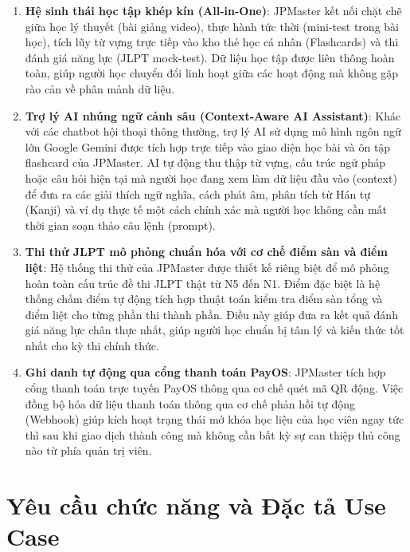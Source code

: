 \documentclass[../DoAn.tex]{subfiles}
\begin{document}
\begin{enumerate}
    \item \textbf{Hệ sinh thái học tập khép kín (All-in-One)}: JPMaster kết nối chặt chẽ giữa học lý thuyết (bài giảng video), thực hành tức thời (mini-test trong bài học), tích lũy từ vựng trực tiếp vào kho thẻ học cá nhân (Flashcards) và thi đánh giá năng lực (JLPT mock-test). Dữ liệu học tập được liên thông hoàn toàn, giúp người học chuyển đổi linh hoạt giữa các hoạt động mà không gặp rào cản về phân mảnh dữ liệu.
    
    \item \textbf{Trợ lý AI nhúng ngữ cảnh sâu (Context-Aware AI Assistant)}: Khác với các chatbot hội thoại thông thường, trợ lý AI sử dụng mô hình ngôn ngữ lớn Google Gemini được tích hợp trực tiếp vào giao diện học bài và ôn tập flashcard của JPMaster. AI tự động thu thập từ vựng, cấu trúc ngữ pháp hoặc câu hỏi hiện tại mà người học đang xem làm dữ liệu đầu vào (context) để đưa ra các giải thích ngữ nghĩa, cách phát âm, phân tích từ Hán tự (Kanji) và ví dụ thực tế một cách chính xác mà người học không cần mất thời gian soạn thảo câu lệnh (prompt).
    
    \item \textbf{Thi thử JLPT mô phỏng chuẩn hóa với cơ chế điểm sàn và điểm liệt}: Hệ thống thi thử của JPMaster được thiết kế riêng biệt để mô phỏng hoàn toàn cấu trúc đề thi JLPT thật từ N5 đến N1. Điểm đặc biệt là hệ thống chấm điểm tự động tích hợp thuật toán kiểm tra điểm sàn tổng và điểm liệt cho từng phần thi thành phần. Điều này giúp đưa ra kết quả đánh giá năng lực chân thực nhất, giúp người học chuẩn bị tâm lý và kiến thức tốt nhất cho kỳ thi chính thức.
    
    \item \textbf{Ghi danh tự động qua cổng thanh toán PayOS}: JPMaster tích hợp cổng thanh toán trực tuyến PayOS thông qua cơ chế quét mã QR động. Việc đồng bộ hóa dữ liệu thanh toán thông qua cơ chế phản hồi tự động (Webhook) giúp kích hoạt trạng thái mở khóa học liệu của học viên ngay tức thì sau khi giao dịch thành công mà không cần bất kỳ sự can thiệp thủ công nào từ phía quản trị viên.
\end{enumerate}

\section{Yêu cầu chức năng và Đặc tả Use Case}
\label{section:2.2}
\end{document}

